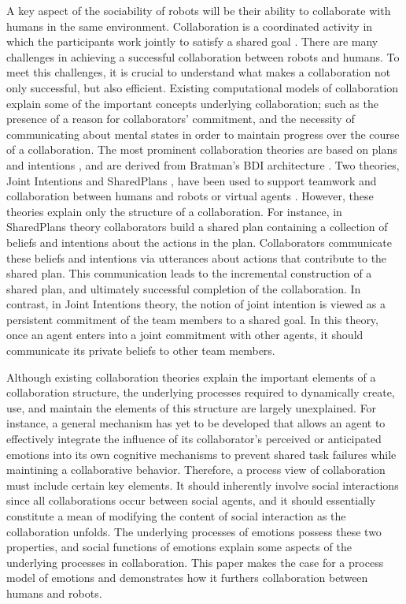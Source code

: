 A key aspect of the sociability of robots will be their ability to collaborate
with humans in the same environment. Collaboration is a coordinated activity in
which the participants work jointly to satisfy a shared goal
\cite{grosz:plans-discourse}. There are many challenges in achieving a
successful collaboration between robots and humans. To meet this challenges, it
is crucial to understand what makes a collaboration not only successful, but
also efficient. Existing computational models of collaboration explain some of
the important concepts underlying collaboration; such as the presence of a
reason for collaborators' commitment, and the necessity of communicating about
mental states in order to maintain progress over the course of a collaboration.
The most prominent collaboration theories are based on plans and intentions
\cite{cohen:teamwork} \cite{grosz:plans-discourse}
\cite{Litman:discourse-commonsense}, and are derived from Bratman's BDI
architecture \cite{bratman:intentions-plans}. Two theories, Joint Intentions
\cite{cohen:teamwork} and SharedPlans
\cite{grosz:planning-acting,grosz:collaboration,grosz:plans-discourse}, have
been used to support teamwork and collaboration between humans and robots or
virtual agents \cite{breazeal:humanoid-robots}
\cite{montreuil:planning-robot-activity} \cite{sidner:enagagement-robot}
\cite{yen:cast}. However, these theories explain only the structure of a
collaboration. For instance, in SharedPlans theory collaborators build a shared
plan containing a collection of beliefs and intentions about the actions in the
plan. Collaborators communicate these beliefs and intentions via utterances
about actions that contribute to the shared plan. This communication leads to
the incremental construction of a shared plan, and ultimately successful
completion of the collaboration. In contrast, in Joint Intentions theory, the
notion of joint intention is viewed as a persistent commitment of the team
members to a shared goal. In this theory, once an agent enters into a joint
commitment with other agents, it should communicate its private beliefs to other
team members.

Although existing collaboration theories explain the important elements of a
collaboration structure, the underlying processes required to dynamically
create, use, and maintain the elements of this structure are largely
unexplained. For instance, a general mechanism has yet to be developed that
allows an agent to effectively integrate the influence of its collaborator's
perceived or anticipated emotions into its own cognitive mechanisms to prevent
shared task failures while maintining a collaborative behavior. Therefore, a
process view of collaboration must include certain key elements. It should
inherently involve social interactions since all collaborations occur between
social agents, and it should essentially constitute a mean of modifying the
content of social interaction as the collaboration unfolds. The underlying
processes of emotions possess these two properties, and social functions of
emotions explain some aspects of the underlying processes in collaboration. This
paper makes the case for a process model of emotions and demonstrates how it
furthers collaboration between humans and robots.

